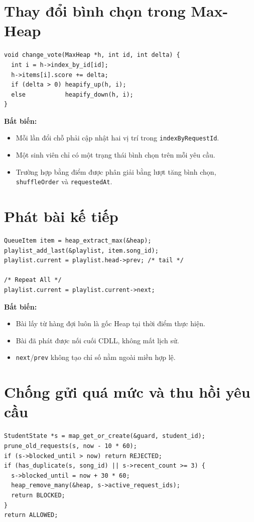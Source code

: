 \documentclass[12pt,a4paper,twoside,openright]{report}
\newcommand{\code}[1]{\texttt{#1}}
\begin{document}
\begin{minipage}[t]{0.49\textwidth}
\section{Thay đổi bình chọn trong Max-Heap}
\begin{lstlisting}
void change_vote(MaxHeap *h, int id, int delta) {
  int i = h->index_by_id[id];
  h->items[i].score += delta;
  if (delta > 0) heapify_up(h, i);
  else           heapify_down(h, i);
}
\end{lstlisting}
\textbf{Bất biến:}
\begin{itemize}
  \item Mỗi lần đổi chỗ phải cập nhật hai vị trí trong \code{indexByRequestId}.
  \item Một sinh viên chỉ có một trạng thái bình chọn trên mỗi yêu cầu.
  \item Trường hợp bằng điểm được phân giải bằng lượt tăng bình chọn,
  \code{shuffleOrder} và \code{requestedAt}.
\end{itemize}
\end{minipage}\hfill
\begin{minipage}[t]{0.49\textwidth}
\section{Phát bài kế tiếp}
\begin{lstlisting}
QueueItem item = heap_extract_max(&heap);
playlist_add_last(&playlist, item.song_id);
playlist.current = playlist.head->prev; /* tail */

/* Repeat All */
playlist.current = playlist.current->next;
\end{lstlisting}
\textbf{Bất biến:}
\begin{itemize}
  \item Bài lấy từ hàng đợi luôn là gốc Heap tại thời điểm thực hiện.
  \item Bài đã phát được nối cuối CDLL, không mất lịch sử.
  \item \code{next}/\code{prev} không tạo chỉ số nằm ngoài miền hợp lệ.
\end{itemize}
\end{minipage}

\section{Chống gửi quá mức và thu hồi yêu cầu}
\begin{lstlisting}
StudentState *s = map_get_or_create(&guard, student_id);
prune_old_requests(s, now - 10 * 60);
if (s->blocked_until > now) return REJECTED;
if (has_duplicate(s, song_id) || s->recent_count >= 3) {
  s->blocked_until = now + 30 * 60;
  heap_remove_many(&heap, s->active_request_ids);
  return BLOCKED;
}
return ALLOWED;
\end{lstlisting}
\end{document}
